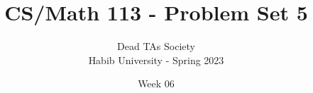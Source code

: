 \documentclass[addpoints]{exam}
\newcommand\union\cup
\newcommand\inter\cap
\newcommand{\N}{\mathbb{N}}
\newcommand{\Z}{\mathbb{Z}}
\newcommand{\olsi}[1]{\,\overline{\!{#1}}} %
\begin{document}
\usepackage{amsmath}
\usepackage{amsthm}
\usepackage{amssymb}
\usepackage{geometry}
\usepackage{venndiagram}
\usepackage{graphicx}
\usepackage{multicol}
\usepackage{multirow}
\usepackage{array}
\usepackage{geometry}
\usepackage[shortlabels]{enumitem}

\pagestyle{headandfoot}
\runningheadrule
\runningfootrule
{}
\firstpageheader{}{}{}

\boxedpoints
\printanswers
\qformat{} %

\newcommand\union\cup
\newcommand\inter\cap
\newcommand{\N}{\mathbb{N}}
\newcommand{\Z}{\mathbb{Z}}
\newcommand{\olsi}[1]{\,\overline{\!{#1}}} %
\newenvironment{problem}[2][Problem]{\begin{trivlist}
\item[\hskip \labelsep {\bfseries #1}\hskip \labelsep {\bfseries #2.}]}{\end{trivlist}}

\newenvironment{definition}[2][Definition]{\begin{trivlist}
    \item[\hskip \labelsep {\bfseries #1}\hskip \labelsep {\bfseries #2.}]}{\end{trivlist}}

\title{CS/Math 113 - Problem Set 5}
\author{Dead TAs Society \\ Habib University - Spring 2023}
\date{Week 06}
\end{document}
